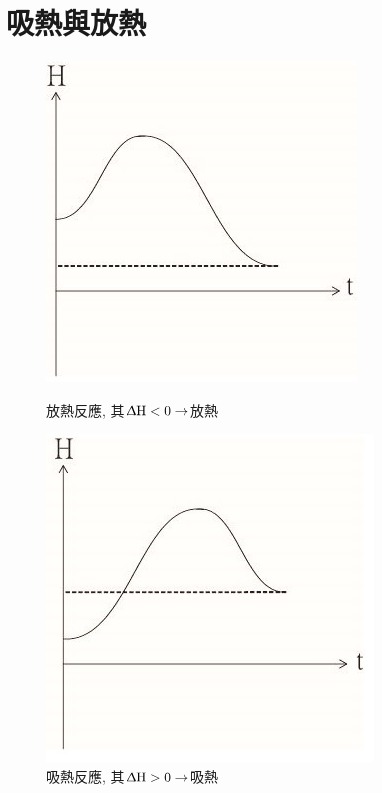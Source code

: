\section{吸熱與放熱}
\begin{figure}[H]
\centering
\begin{minipage}{0.5\textwidth}
\graphicspath{{chemistry/}}
\includegraphics[width=\linewidth, center]{放熱.jpg}
\caption{放熱反應, 其$\rm \Updelta H<0 \rightarrow$放熱}
\label{fig:exothermal}
\end{minipage}%
\begin{minipage}{0.5\textwidth}
\centering
\graphicspath{{chemistry/}}
\includegraphics[width=\linewidth, center]{吸熱.jpg}
\caption{吸熱反應, 其$\rm \Updelta H>0 \rightarrow$吸熱}
\label{fig:endthermal}
\end{minipage}
\end{figure}

